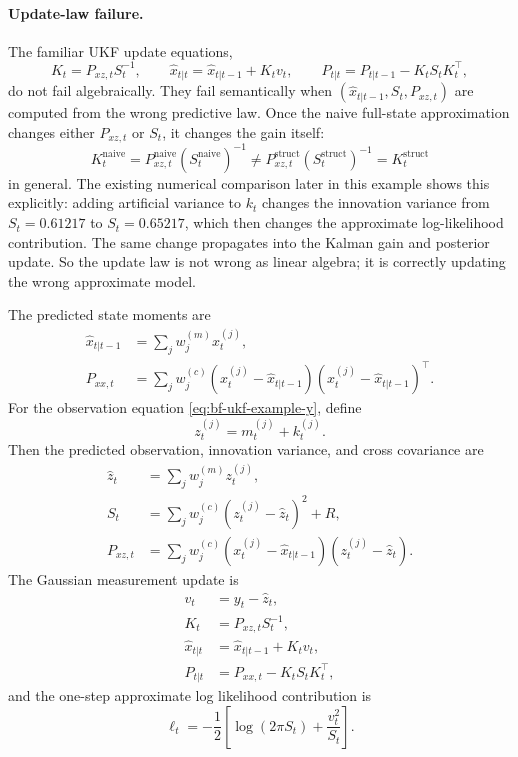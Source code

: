 \paragraph{Update-law failure.}
The familiar UKF update equations,
\[
  K_t = P_{xz,t} S_t^{-1},
  \qquad
  \hat x_{t|t} = \hat x_{t|t-1} + K_t v_t,
  \qquad
  P_{t|t} = P_{t|t-1} - K_t S_t K_t^\top,
\]
do not fail algebraically.  They fail semantically when
$(\hat x_{t|t-1},S_t,P_{xz,t})$ are computed from the wrong predictive law.
Once the naive full-state approximation changes either $P_{xz,t}$ or $S_t$, it
changes the gain itself:
\[
  K_t^{\mathrm{naive}}
  =
  P_{xz,t}^{\mathrm{naive}} \left(S_t^{\mathrm{naive}}\right)^{-1}
  \neq
  P_{xz,t}^{\mathrm{struct}} \left(S_t^{\mathrm{struct}}\right)^{-1}
  = K_t^{\mathrm{struct}}
\]
in general.  The existing numerical comparison later in this example shows this
explicitly: adding artificial variance to $k_t$ changes the innovation variance
from $S_t=0.61217$ to $S_t=0.65217$, which then changes the approximate
log-likelihood contribution.  The same change propagates into the Kalman gain
and posterior update.  So the update law is not wrong as linear algebra; it is
correctly updating the wrong approximate model.

The predicted state moments are
\begin{align}
  \hat x_{t|t-1}
    &= \sum_j w_j^{(m)} x_t^{(j)},\\
  P_{xx,t}
    &= \sum_j w_j^{(c)}
       \left(x_t^{(j)}-\hat x_{t|t-1}\right)
       \left(x_t^{(j)}-\hat x_{t|t-1}\right)^\top .
\end{align}
For the observation equation \eqref{eq:bf-ukf-example-y}, define
\[
  z_t^{(j)}=m_t^{(j)}+k_t^{(j)}.
\]
Then the predicted observation, innovation variance, and cross covariance are
\begin{align}
  \hat z_t
    &= \sum_j w_j^{(m)} z_t^{(j)},\\
  S_t
    &= \sum_j w_j^{(c)}(z_t^{(j)}-\hat z_t)^2 + R,\\
  P_{xz,t}
    &= \sum_j w_j^{(c)}
       \left(x_t^{(j)}-\hat x_{t|t-1}\right)(z_t^{(j)}-\hat z_t).
\end{align}
The Gaussian measurement update is
\begin{align}
  v_t &= y_t-\hat z_t,\\
  K_t &= P_{xz,t}S_t^{-1},\\
  \hat x_{t|t} &= \hat x_{t|t-1}+K_tv_t,\\
  P_{t|t} &= P_{xx,t}-K_tS_tK_t^\top,
\end{align}
and the one-step approximate log likelihood contribution is
\[
  \ell_t
  =
  -\frac{1}{2}\left[
    \log(2\pi S_t)+\frac{v_t^2}{S_t}
  \right].
\]

